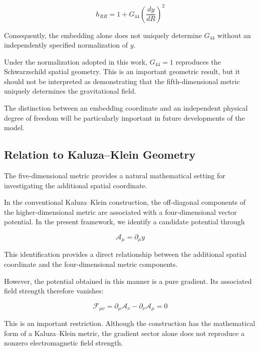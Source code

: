 \documentclass[pdflatex,sn-mathphys-num]{sn-jnl}%
\theoremstyle{thmstyleone}%
\theoremstyle{thmstyletwo}%
\theoremstyle{thmstylethree}%
\begin{document}
\begin{equation}
    h_{RR}
    =
    1+
    G_{44}
    \left(\frac{dy}{dR}\right)^2
\end{equation}

Consequently, the embedding alone does not uniquely determine $G_{44}$ without an independently specified normalization of $y$.

Under the normalization adopted in this work, $G_{44}=1$ reproduces the Schwarzschild spatial geometry. This is an important geometric result, but it should not be interpreted as demonstrating that the fifth-dimensional metric uniquely determines the gravitational field.

The distinction between an embedding coordinate and an independent physical degree of freedom will be particularly important in future developments of the model.

\subsection{Relation to Kaluza--Klein Geometry}

The five-dimensional metric provides a natural mathematical setting for investigating the additional spatial coordinate.

In the conventional Kaluza--Klein construction, the off-diagonal components of the higher-dimensional metric are associated with a four-dimensional vector potential. In the present framework, we identify a candidate potential through

\begin{equation}
    \mathcal{A}_{\mu}
    =
    \partial_{\mu}y
\end{equation}

This identification provides a direct relationship between the additional spatial coordinate and the four-dimensional metric components.

However, the potential obtained in this manner is a pure gradient. Its associated field strength therefore vanishes:

\begin{equation}
    \mathcal{F}_{\mu\nu}
    =
    \partial_{\mu}\mathcal{A}_{\nu}
    -
    \partial_{\nu}\mathcal{A}_{\mu}
    =
    0
\end{equation}

This is an important restriction. Although the construction has the mathematical form of a Kaluza--Klein metric, the gradient sector alone does not reproduce a nonzero electromagnetic field strength.
\end{document}
